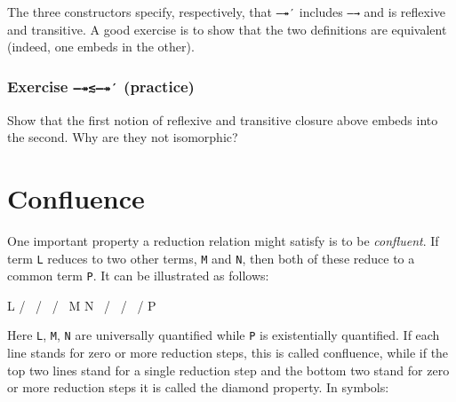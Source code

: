 The three constructors specify, respectively, that \texttt{—↠′} includes
\texttt{—→} and is reflexive and transitive. A good exercise is to show
that the two definitions are equivalent (indeed, one embeds in the
other).

\hypertarget{exercise-practice}{%
\subsubsection{\texorpdfstring{Exercise \texttt{—↠≲—↠′}
(practice)}{Exercise ---↠≲---↠′ (practice)}}\label{exercise-practice}}

Show that the first notion of reflexive and transitive closure above
embeds into the second. Why are they not isomorphic?

\begin{fence}
\begin{code}%
\>[0]\<%
\end{code}
\end{fence}

\hypertarget{confluence}{%
\section{Confluence}\label{confluence}}

One important property a reduction relation might satisfy is to be
\emph{confluent}. If term \texttt{L} reduces to two other terms,
\texttt{M} and \texttt{N}, then both of these reduce to a common term
\texttt{P}. It can be illustrated as follows:

\begin{myDisplay}
           L
          / \
         /   \
        /     \
       M       N
        \     /
         \   /
          \ /
           P
\end{myDisplay}

Here \texttt{L}, \texttt{M}, \texttt{N} are universally quantified while
\texttt{P} is existentially quantified. If each line stands for zero or
more reduction steps, this is called confluence, while if the top two
lines stand for a single reduction step and the bottom two stand for
zero or more reduction steps it is called the diamond property. In
symbols:

